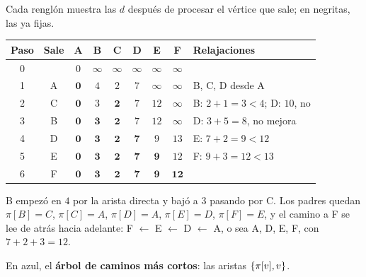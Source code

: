 \documentclass[11pt,letterpaper]{article}
\begin{document}
\begin{ejemplo}
  Cada renglón muestra las $d$ después de procesar el vértice que
  sale; en negritas, las ya fijas.
  \begin{center}
  \small
  \begin{tabular}{ccccccccl}
    \toprule
    \textbf{Paso} & \textbf{Sale} & A & B & C & D & E & F
      & \textbf{Relajaciones} \\
    \midrule
    0 & & $0$ & $\infty$ & $\infty$ & $\infty$ & $\infty$ & $\infty$
      & \\
    1 & A & $\mathbf{0}$ & $4$ & $2$ & $7$ & $\infty$ & $\infty$
      & B, C, D desde A \\
    2 & C & $\mathbf{0}$ & $3$ & $\mathbf{2}$ & $7$ & $12$ & $\infty$
      & B: $2 + 1 = 3 < 4$; D: $10$, no \\
    3 & B & $\mathbf{0}$ & $\mathbf{3}$ & $\mathbf{2}$ & $7$ & $12$
      & $\infty$ & D: $3 + 5 = 8$, no mejora \\
    4 & D & $\mathbf{0}$ & $\mathbf{3}$ & $\mathbf{2}$ & $\mathbf{7}$
      & $9$ & $13$ & E: $7 + 2 = 9 < 12$ \\
    5 & E & $\mathbf{0}$ & $\mathbf{3}$ & $\mathbf{2}$ & $\mathbf{7}$
      & $\mathbf{9}$ & $12$ & F: $9 + 3 = 12 < 13$ \\
    6 & F & $\mathbf{0}$ & $\mathbf{3}$ & $\mathbf{2}$ & $\mathbf{7}$
      & $\mathbf{9}$ & $\mathbf{12}$ & \\
    \bottomrule
  \end{tabular}
  \end{center}
  B empezó en $4$ por la arista directa y bajó a $3$ pasando por C. Los
  padres quedan $\pi[B] = C$, $\pi[C] = A$, $\pi[D] = A$,
  $\pi[E] = D$, $\pi[F] = E$, y el camino a F se lee de atrás hacia
  adelante: F $\leftarrow$ E $\leftarrow$ D $\leftarrow$ A, o sea
  A, D, E, F, con $7 + 2 + 3 = 12$.
  \begin{center}
  \end{center}
  En azul, el \textbf{árbol de caminos más cortos}: las aristas
  $\left\{ \pi[v], v \right\}$.
\end{ejemplo}
\end{document}
